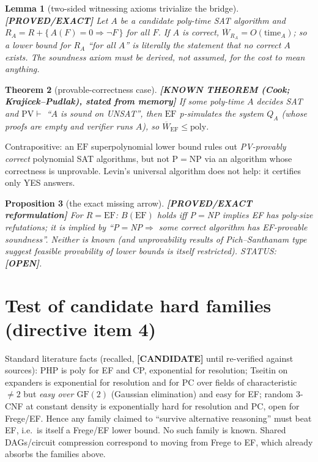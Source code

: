 \documentclass[11pt]{article}
\newtheorem{theorem}{Theorem}
\newtheorem{proposition}[theorem]{Proposition}
\newtheorem{lemma}[theorem]{Lemma}
\theoremstyle{remark}
\newcommand{\status}[1]{\textbf{[#1]}}
\newcommand{\Wb}{\overline W}
\begin{document}
\begin{lemma}[two-sided witnessing axioms trivialize the bridge]\status{PROVED/EXACT}
Let $A$ be a candidate poly-time SAT algorithm and $R_A=R+\{\,A(F)=0\Rightarrow\neg F\,\}$ for all $F$. If $A$ is correct, $\Wb_{R_A}=O(\mathrm{time}_A)$; so a lower bound for $R_A$ ``for all $A$'' is literally the statement that no correct $A$ exists. The soundness axiom must be \emph{derived}, not assumed, for the cost to mean anything.
\end{lemma}

\begin{theorem}[provable-correctness case]\status{KNOWN THEOREM (Cook; Krajicek--Pudlak), stated from memory}
If some poly-time $A$ decides SAT and $\mathrm{PV}\vdash$ ``$A$ is sound on UNSAT'', then $\mathrm{EF}$ p-simulates the system $Q_A$ (whose proofs are empty and verifier runs $A$), so $\Wb_{\mathrm{EF}}\le\mathrm{poly}$.
\end{theorem}
\noindent Contrapositive: an $\mathrm{EF}$ superpolynomial lower bound rules out \emph{PV-provably correct} polynomial SAT algorithms, but not P$=$NP via an algorithm whose correctness is unprovable. Levin's universal algorithm does not help: it certifies only YES answers.

\begin{proposition}[the exact missing arrow]\status{PROVED/EXACT reformulation}
For $R=\mathrm{EF}$: $B(\mathrm{EF})$ holds iff P$=$NP implies EF has poly-size refutations; it is implied by ``P$=$NP$\Rightarrow$ some correct algorithm has EF-provable soundness''. Neither is known (and unprovability results of Pich--Santhanam type suggest feasible provability of lower bounds is itself restricted). STATUS: \status{OPEN}.
\end{proposition}

\section{Test of candidate hard families (directive item 4)}
Standard literature facts (recalled, \status{CANDIDATE} until re-verified against sources): PHP is poly for EF and CP, exponential for resolution; Tseitin on expanders is exponential for resolution and for PC over fields of characteristic $\neq2$ but \emph{easy over $\mathrm{GF}(2)$} (Gaussian elimination) and easy for EF; random 3-CNF at constant density is exponentially hard for resolution and PC, open for Frege/EF. Hence any family claimed to ``survive alternative reasoning'' must beat EF, i.e.\ is itself a Frege/EF lower bound. No such family is known. Shared DAGs/circuit compression correspond to moving from Frege to EF, which already absorbs the families above.
\end{document}
